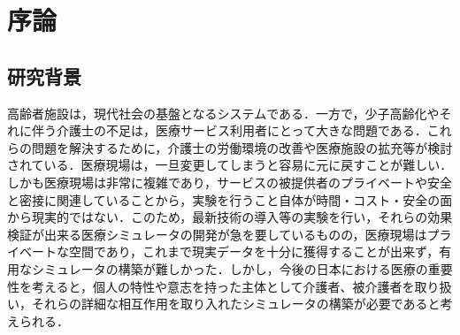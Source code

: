 \chapter{序論}

\section{研究背景}

高齢者施設は，現代社会の基盤となるシステムである．一方で，少子高齢化やそれに伴う介護士の不足は，医療サービス利用者にとって大きな問題である．これらの問題を解決するために，介護士の労働環境の改善や医療施設の拡充等が検討されている．医療現場は，一旦変更してしまうと容易に元に戻すことが難しい．しかも医療現場は非常に複雑であり，サービスの被提供者のプライベートや安全と密接に関連していることから，実験を行うこと自体が時間・コスト・安全の面から現実的ではない．このため，最新技術の導入等の実験を行い，それらの効果検証が出来る医療シミュレータの開発が急を要しているものの，医療現場はプライベートな空間であり，これまで現実データを十分に獲得することが出来ず，有用なシミュレータの構築が難しかった．しかし，今後の日本における医療の重要性を考えると，個人の特性や意志を持った主体として介護者、被介護者を取り扱い，それらの詳細な相互作用を取り入れたシミュレータの構築が必要であると考えられる．

